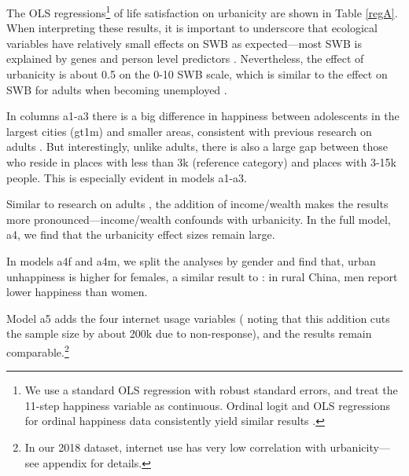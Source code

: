 \documentclass[10pt, letterpaper]{article}
\begin{document}
\begin{spacing}{1.4}
The OLS regressions\footnote{We use a standard OLS regression with robust
  standard errors, and treat the 11-step happiness variable as
  continuous. Ordinal logit and OLS regressions for ordinal  happiness data consistently yield similar results \citep{carbonell04}.
%                                                                                                                  
} of life satisfaction on urbanicity are shown in Table \ref{regA}.
When interpreting these results, it is important to underscore that ecological
variables have relatively small effects on SWB as
 expected---most SWB is explained by genes \citep{schnittker08} and person level
 predictors \citep{veenhoven14b}. Nevertheless, the effect of urbanicity is
 about 0.5 on the 0-10 SWB scale,  which is similar to the
effect on SWB for adults when becoming unemployed \citep{clark2008lags}.
   
In columns a1-a3 %
there is a big difference in happiness between adolescents in the largest cities (gt1m) and smaller areas, consistent with previous research on adults \citep{aok-ls_fisher16}. But interestingly, unlike adults,
there is also a large gap between those who reside in places with less than 3k (reference category) and places with 3-15k people. This is especially evident in models a1-a3.%

Similar to research on adults \citep{aok21}, the addition of income/wealth makes
the results more pronounced---income/wealth confounds with urbanicity.
In the full model, a4, we find that the urbanicity effect sizes remain large.

In models a4f and a4m, we split the analyses by gender and find that, urban unhappiness is higher for
females, a similar result to \citet{knight2010rural}: in rural China, men report lower happiness than women.

Model a5  adds the four internet usage variables  (%
noting that this addition cuts the sample size by about 200k due to non-response),
and the results remain comparable.\footnote{In our 2018 dataset, internet use has very low correlation with urbanicity---see appendix for details.} %


\end{spacing}
\end{document}
